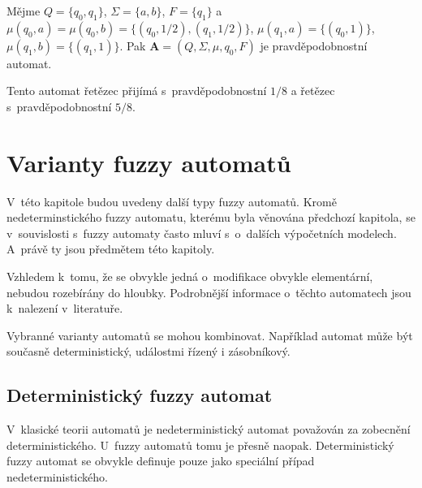 \begin{example}
 Mějme $Q = \{ q_0, q_1 \}$, $\Sigma = \{ a, b \}$, $F = \{ q_1 \}$ a $\mu(q_0, a) = \mu(q_0, b) = \{ (q_0, 1/2), (q_1, 1/2) \}$, $\mu(q_1, a) = \{ (q_0, 1) \}$, $\mu(q_1, b) = \{ (q_1, 1) \}$. Pak $\mathbf{A} = (Q, \Sigma, \mu, q_0, F)$ je pravděpodobnostní automat.
 
 Tento automat řetězec  přijímá s~pravděpodobnostní $1/8$ a řetězec  s~pravděpodobnostní $5/8$.
\end{example}



\section{Varianty fuzzy automatů}
V~této kapitole budou uvedeny další typy fuzzy automatů. Kromě nedeterminstického fuzzy automatu, kterému byla věnována předchozí kapitola, se v~souvislosti s~fuzzy automaty často mluví s~o~dalších výpočetních modelech. A~právě ty jsou předmětem této kapitoly. 

Vzhledem k~tomu, že se obvykle jedná o~modifikace obvykle elementární, nebudou rozebírány do hloubky. Podrobnější informace o~těchto automatech jsou k~nalezení v~literatuře.

\begin{note}
 Vybranné varianty automatů se mohou kombinovat. Například automat může být současně deterministický, událostmi řízený i zásobníkový.
\end{note}

\subsection{Deterministický fuzzy automat}

V~klasické teorii automatů je nedeterministický automat považován za zobecnění deterministického. U~fuzzy automatů tomu je přesně naopak. Deterministický fuzzy automat se obvykle definuje pouze jako speciální případ nedeterministického.

